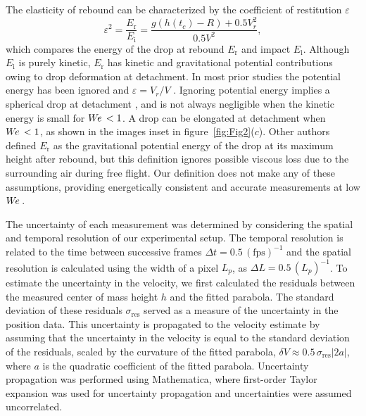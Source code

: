 \documentclass{jfm}
\newcommand{\We}{W\kern-0.15em e\,}
\begin{document}
The elasticity of rebound can be characterized by the coefficient of restitution $\varepsilon$
\begin{equation}
\varepsilon^{2} =\frac{E_{\textrm{r}}}{E_{\textrm{i}}}= \frac{g(h(t_{c}) - R)+0.5 V_{r}^{2}}{0.5 V^2},
\label{eq:equation1}
\end{equation}
which compares the energy of the drop at rebound $E_{\textrm{r}}$ and impact $E_{\textrm{i}}$. Although $E_{\textrm{i}}$ is purely kinetic, $E_{\textrm{r}}$ has kinetic and gravitational potential contributions owing to drop deformation at detachment. In most prior studies the potential energy has been ignored and $\varepsilon = V_{r} / V$ \citep{richard2000bouncing,biance2006elasticity,de2015wettability,hao2015superhydrophobic,jha2020viscous}. Ignoring potential energy implies a spherical drop at detachment \citep{richard2000bouncing}, and is not always negligible when the kinetic energy is small for $\We<1$. A drop can be elongated at detachment when $\We<1$, as shown in the images inset in figure~\ref{fig:Fig2}($c$). Other authors defined $E_{\textrm{r}}$ as the gravitational potential energy of the drop at its maximum height after rebound, but this definition ignores possible viscous loss due to the surrounding air during free flight\citep{wang2022successive,thenarianto2023energy}. Our definition does not make any of these assumptions, providing energetically consistent and accurate measurements at low $\We$.

The uncertainty of each measurement was determined by considering the spatial and temporal resolution of our experimental setup. The temporal resolution is related to the time between successive frames $\Delta t = 0.5 \, \left(\textrm{fps}\right)^{-1}$ and the spatial resolution is calculated using the width of a pixel $L_p$, as $\Delta L = 0.5 \, \left( L_{p} \right) ^{-1}$. To estimate the uncertainty in the velocity, we first calculated the residuals between the measured center of mass height $h$ and the fitted parabola. The standard deviation of these residuals $\sigma_{\textrm{res}}$ served as a measure of the uncertainty in the position data. This uncertainty is propagated to the velocity estimate by assuming that the uncertainty in the velocity is equal to the standard deviation of the residuals, scaled by the curvature of the fitted parabola, $\delta V \approx 0.5 \, \sigma_{\textrm{res}}  \left| 2 a \right| $, where $a$ is the quadratic coefficient of the fitted parabola. Uncertainty propagation was performed using Mathematica, where first-order Taylor expansion was used for uncertainty propagation and uncertainties were assumed uncorrelated.   
\end{document}
